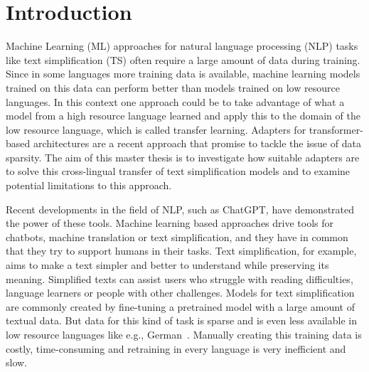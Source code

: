 \section{Introduction}
Machine Learning (ML) approaches for natural language processing (NLP) tasks like
text simplification (TS) often require a large amount of data during training.
Since in some languages more training data is available, machine learning models
trained on this data can perform better than models trained on low resource languages.
In this context one approach could be to take advantage of what a model from a high resource
language learned and apply this to the domain of the low resource language, which is
called transfer learning.
Adapters for transformer-based architectures are a recent approach that promise to tackle the issue of data sparsity.
The aim of this master thesis is to investigate how suitable adapters are to solve this cross-lingual transfer
of text simplification models and to examine potential limitations to this approach. 

Recent developments in the field of NLP, such as ChatGPT, have demonstrated the power of
these tools. Machine learning based approaches drive tools for chatbots, machine translation or text simplification, and 
they have in common that they try to support humans in their tasks.
Text simplification, for example, aims to make a text simpler and better to understand while preserving its meaning.
Simplified texts can assist users who struggle with reading difficulties, language learners or people with other challenges.
Models for text simplification are commonly created by fine-tuning a pretrained model with a large amount of textual data.
But data for this kind of task is sparse and is even less available in low resource languages like e.g., German~\cite{Rios2021}.
Manually creating this training data is costly, time-consuming and retraining in every language is very inefficient and slow.

